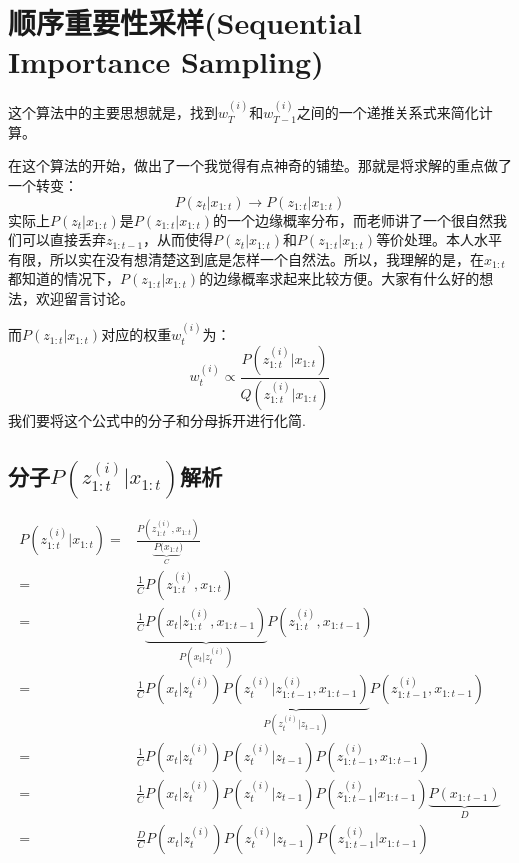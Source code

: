 \documentclass[a4paper]{article}
\begin{document}
\section{顺序重要性采样(Sequential Importance Sampling)}
这个算法中的主要思想就是，找到$w^{(i)}_T$和$w^{(i)}_{T-1}$之间的一个递推关系式来简化计算。

在这个算法的开始，做出了一个我觉得有点神奇的铺垫。那就是将求解的重点做了一个转变：
\begin{equation}
    P(z_t|x_{1:t}) \longrightarrow P(z_{1:t}|x_{1:t}) 
\end{equation}
实际上$P(z_t|x_{1:t})$是$P(z_{1:t}|x_{1:t})$的一个边缘概率分布，而老师讲了一个很自然我们可以直接丢弃$z_{1:t-1}$，从而使得$P(z_t|x_{1:t})$和$P(z_{1:t}|x_{1:t})$等价处理。本人水平有限，所以实在没有想清楚这到底是怎样一个自然法。所以，我理解的是，在$x_{1:t}$都知道的情况下，$P(z_{1:t}|x_{1:t})$的边缘概率求起来比较方便。大家有什么好的想法，欢迎留言讨论。

而$P(z_{1:t}|x_{1:t})$对应的权重$w_t^{(i)}$为：
\begin{equation}
    w_t^{(i)} \propto \frac{P(z_{1:t}^{(i)}|x_{1:t})}{Q(z_{1:t}^{(i)}|x_{1:t})}
\end{equation}
我们要将这个公式中的分子和分母拆开进行化简.
\subsection{分子$P(z_{1:t}^{(i)}|x_{1:t})$解析}
\begin{equation}
    \begin{split}
        P(z_{1:t}^{(i)}|x_{1:t}) 
        = & \frac{P(z_{1:t}^{(i)},x_{1:t})}{\underbrace{P(x_{1:t}}_{C})} \\
        = & \frac{1}{C} P(z_{1:t}^{(i)},x_{1:t}) \\
        = & \frac{1}{C}\underbrace{P(x_t|z_{1:t}^{(i)},x_{1:t-1})}_{P(x_t|z_t^{(i)})}P(z_{1:t}^{(i)},x_{1:t-1}) \\
        = & \frac{1}{C} P(x_t|z_t^{(i)}) \underbrace{P(z_t^{(i)}|z_{1:t-1}^{(i)},x_{1:t-1})}_{P(z_t^{(i)}|z_{t-1})} P(z_{1:t-1}^{(i)},x_{1:t-1}) \\
        = & \frac{1}{C} P(x_t|z_t^{(i)})P(z_t^{(i)}|z_{t-1})P(z_{1:t-1}^{(i)},x_{1:t-1}) \\
        = & \frac{1}{C} P(x_t|z_t^{(i)})P(z_t^{(i)}|z_{t-1})P(z_{1:t-1}^{(i)}|x_{1:t-1})\underbrace{P(x_{1:t-1})}_{D} \\ 
        = & \frac{D}{C} P(x_t|z_t^{(i)})P(z_t^{(i)}|z_{t-1})P(z_{1:t-1}^{(i)}|x_{1:t-1})
    \end{split}
\end{equation}
\end{document}
